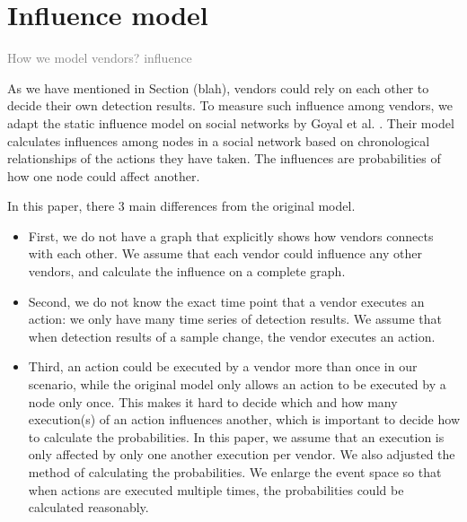\section{Influence model}


\textcolor{gray}{How we model vendors? influence}

As we have mentioned in Section (blah), vendors could rely on each other to decide their own detection results. 
To measure such influence among vendors, we adapt the static influence model on social networks by Goyal et al. \cite{goyal2010learning}. 
Their model calculates influences among nodes in a social network based on chronological relationships of the actions they have taken.
The influences are probabilities of how one node could affect another.

In this paper, there 3 main differences from the original model. 
\begin{itemize}
	\item First, we do not have a graph that explicitly shows how vendors connects with each other. 
	We assume that each vendor could influence any other vendors, and calculate the influence on a complete graph. 
	\item Second, we do not know the exact time point that a vendor executes an action: we only have many time series of detection results. 
	We assume that when detection results of a sample change, the vendor executes an action.
	\item Third, an action could be executed by a vendor more than once in our scenario, while the original model only allows an action to be executed by a node only once. 
	This makes it hard to decide which and how many execution(s) of an action influences another, which is important to decide how to calculate the probabilities.
	In this paper, we assume that an execution is only affected by only one another execution per vendor.
	We also adjusted the method of calculating the probabilities. We enlarge the event space so that when actions are executed multiple times, the probabilities could be calculated reasonably. 
	
\end{itemize}


